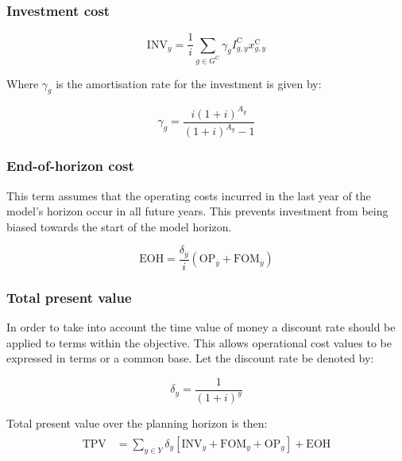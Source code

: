 \documentclass{article}
\newcommand{\sGeneratorsCandidate}{G^{\mathrm{C}}}
\newcommand{\sYears}{Y}
\newcommand{\iGenerator}{g}
\newcommand{\iYear}{y}
\newcommand{\iYearTerminal}{\overline{\iYear}}
\newcommand{\iScenario}{s}
\newcommand{\cOperatingCost}[1][\iYear,\iScenario]{\mathrm{OP}_{#1}}
\newcommand{\cFixedOperationsMaintenanceCost}[1][\iYear]{\mathrm{FOM}_{#1}}
\newcommand{\cAmortisationRate}[1][\iGenerator]{\gamma_{#1}}
\newcommand{\cCandidateInvestmentCost}[1][\iGenerator,\iYear]{I^{\mathrm{C}}_{#1}}
\newcommand{\cInvestmentCost}[1][\iYear]{\mathrm{INV}_{#1}}
\newcommand{\cInterestRate}{i}
\newcommand{\cAssetLifetime}[1][\iGenerator]{A_{#1}}
\newcommand{\cTotalPresentValue}[1][]{\mathrm{TPV}_{#1}}
\newcommand{\cDiscountRate}[1][\iYear]{\delta_{#1}}
\newcommand{\vInstalledCapacity}[1][\iGenerator,\iYear]{x^{\mathrm{C}}_{#1}}
\newcommand{\cEndOfHorizonCost}{\textrm{EOH}}
\begin{document}
\subsubsection{Investment cost}

\begin{equation}
	\cInvestmentCost = \frac{1}{\cInterestRate}\sum\limits_{g\in \sGeneratorsCandidate} \cAmortisationRate  \cCandidateInvestmentCost \vInstalledCapacity
\end{equation}

Where $\cAmortisationRate$ is the amortisation rate for the investment is given by:

\begin{equation}
	\cAmortisationRate = \frac{\cInterestRate(1+\cInterestRate)^{\cAssetLifetime}}{(1+\cInterestRate)^{\cAssetLifetime} - 1}
\end{equation}

\subsubsection{End-of-horizon cost}
This term assumes that the operating costs incurred in the last year of the model's horizon occur in all future years. This prevents investment from being biased towards the start of the model horizon.

\begin{equation}
	\cEndOfHorizonCost = \frac{\cDiscountRate[\iYearTerminal]}{\cInterestRate} \left(\cOperatingCost[\iYearTerminal] + \cFixedOperationsMaintenanceCost[\iYearTerminal] \right)
\end{equation}

\subsubsection{Total present value}
In order to take into account the time value of money a discount rate should be applied to terms within the objective. This allows operational cost values to be expressed in terms or a common base. Let the discount rate be denoted by:

\begin{equation}
	\cDiscountRate = \frac{1}{(1 + \cInterestRate)^{\iYear}}
\end{equation}

Total present value over the planning horizon is then:
\begin{align}
	\begin{split}
		\cTotalPresentValue & = \sum\limits_{\iYear \in \sYears} \cDiscountRate \left[\cInvestmentCost + \cFixedOperationsMaintenanceCost + \cOperatingCost[\iYear] \right] + \cEndOfHorizonCost
	\end{split}
\end{align}
\end{document}
